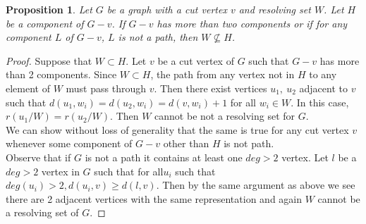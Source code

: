 \documentclass[11pt]{amsart}
\theoremstyle{plain}  %
\newtheorem{prop}[thm]{Proposition}
\theoremstyle{definition}
\theoremstyle{remark}
\numberwithin{equation}{thm}
\begin{document}
\begin{prop}
 Let $G$ be a graph with a cut vertex $v$ and resolving set $W$. Let $H$ be a component of $G-v$. 
 If $G-v$ has more than two components or if for any component $L$ of $G-v$, $L$ is not a path, then $W\nsubseteq H$.
\end{prop}
\begin{proof}
 Suppose that $W \subset H$. 
 Let $v$ be a cut vertex of $G$ such that $G-v$ has more than 2 components. Since $W \subset H$, the path from any vertex not in $H$ to any element of $W$ must pass through $v$.
 Then there exist vertices $u_1,\ u_2$ adjacent to $v$ such that $d(u_1, w_i) = d(u_2, w_i) = d(v, w_i) + 1$ for all $w_i \in W$.
 In this case, $r(u_1/W) = r(u_2/W)$. Then $W$ cannot be not a resolving set for $G$.\\
 We can show without loss of generality that the same is true for any cut vertex $v$ whenever some component of $G-v$ other than $H$ is not path.\\
 Observe that if $G$ is not a path it contains at least one $deg > 2$ vertex. 
 Let $l$ be a $deg > 2$ vertex in $G$ such that for all$u_i$ such that $deg(u_i)>2, d(u_i, v) \geq d(l, v)$. 
 Then by the same argument as above we see there are 2 adjacent vertices with the same representation and again $W$ cannot be a resolving set of $G$.
 \end{proof}
\end{document}
